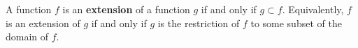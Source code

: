 A function $f$ is an \textbf{extension} of a function $g$ if and only if $g \subset f$. Equivalently, $f$ is an extension of $g$ if and only if $g$ is the restriction of $f$ to some subset of the domain of $f$.
